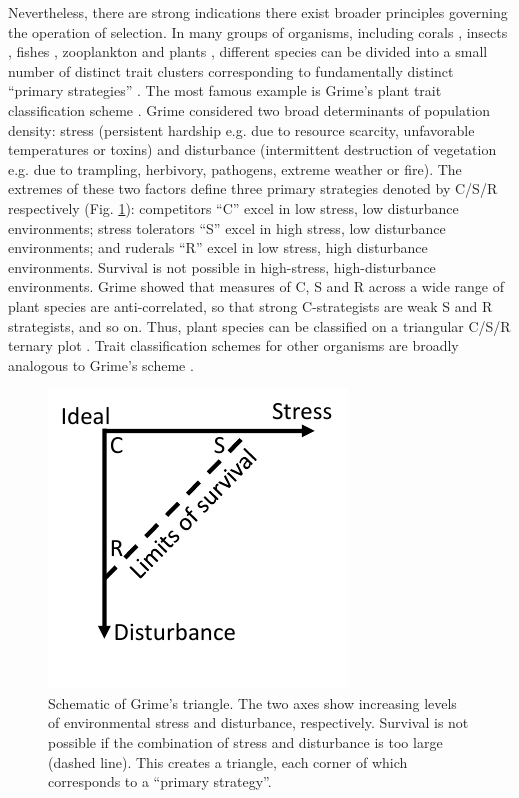\documentclass[11pt]{article}
\begin{document}
Nevertheless, there are strong indications there exist broader principles governing the operation of selection. In many groups of organisms, including corals \citep{darling_2012}, insects \citep{southwood_1977}, fishes \citep{winemiller_1992}, zooplankton \citep{allan_76} and plants \citep{grime_1988,westoby_1998}, different species can be divided into a small number of distinct trait clusters corresponding to fundamentally distinct ``primary strategies'' \citep{winemiller_2015}. The most famous example is Grime's plant trait classification scheme \citep{grime_1974,grime_1977,grime_1988}. Grime considered two broad determinants of population density: stress (persistent hardship e.g. due to resource scarcity, unfavorable temperatures or toxins) and disturbance (intermittent destruction of vegetation e.g. due to trampling, herbivory, pathogens, extreme weather or fire).  The extremes of these two factors define three primary strategies denoted by C/S/R respectively (Fig. \ref{fig:grimeschematic}): competitors ``C'' excel in low stress, low disturbance environments; stress tolerators ``S'' excel in high stress, low disturbance environments; and ruderals ``R''  excel in low stress, high disturbance environments. Survival is not possible in high-stress, high-disturbance environments. Grime showed that measures of C, S and R across a wide range of plant species are anti-correlated, so that strong C-strategists are weak S and R strategists, and so on. Thus, plant species can be classified on a triangular C/S/R ternary plot \citep{grime_1974}. Trait classification schemes for other organisms are broadly analogous to Grime's scheme \citep{winemiller_2015}. 

\begin{figure}
\centering
\includegraphics[scale=1]{grimeschematic.pdf}
\caption{\label{fig:grimeschematic} Schematic of Grime's triangle. The two axes show increasing levels of environmental stress and disturbance, respectively. Survival is not possible if the combination of stress and disturbance is too large (dashed line). This creates a triangle, each corner of which corresponds to a ``primary strategy''.} 
\end{figure}
\end{document}
